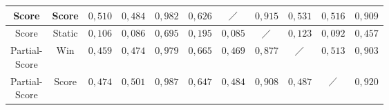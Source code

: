\begin{table}[H]
{\begin{tabular}{|c|c|c|c|c|c|c|c|c|c|c|}
            Score                             & Score         & \cellcolor[HTML]{fceb84}$0{,}510$ & \cellcolor[HTML]{fee683}$0{,}484$ & \cellcolor[HTML]{69c07c}$0{,}982$ & \cellcolor[HTML]{d8e082}$0{,}626$ & $\diagup$                         & \cellcolor[HTML]{7ec67d}$0{,}915$ & \cellcolor[HTML]{f6e984}$0{,}531$ & \cellcolor[HTML]{fbea84}$0{,}516$ & \cellcolor[HTML]{80c77d}$0{,}909$ \\ \hline
            Score                             & Static        & \cellcolor[HTML]{f98470}$0{,}106$ & \cellcolor[HTML]{f97f6f}$0{,}086$ & \cellcolor[HTML]{c3da81}$0{,}695$ & \cellcolor[HTML]{fa9b74}$0{,}195$ & \cellcolor[HTML]{f97f6f}$0{,}085$ & $\diagup$                         & \cellcolor[HTML]{f98871}$0{,}123$ & \cellcolor[HTML]{f9806f}$0{,}092$ & \cellcolor[HTML]{fedf81}$0{,}457$ \\ \hline
            \tiny \makecell{Partial-                                                                                                                                                                                                                                                                                                                                                              \\Score} &           Win & \cellcolor[HTML]{fee081}$0{,}459$ & \cellcolor[HTML]{fee482}$0{,}474$ & \cellcolor[HTML]{6ac07c}$0{,}979$ & \cellcolor[HTML]{ccdd82}$0{,}665$ & \cellcolor[HTML]{fee282}$0{,}469$ & \cellcolor[HTML]{8aca7e}$0{,}877$ & $\diagup$                         & \cellcolor[HTML]{fbea84}$0{,}513$ & \cellcolor[HTML]{82c77d}$0{,}903$ \\ \hline
            \tiny \makecell{Partial-                                                                                                                                                                                                                                                                                                                                                              \\Score} &         Score & \cellcolor[HTML]{fee482}$0{,}474$ & \cellcolor[HTML]{ffeb84}$0{,}501$ & \cellcolor[HTML]{68c07c}$0{,}987$ & \cellcolor[HTML]{d2de82}$0{,}647$ & \cellcolor[HTML]{fee683}$0{,}484$ & \cellcolor[HTML]{80c77d}$0{,}908$ & \cellcolor[HTML]{fee783}$0{,}487$ & $\diagup$                         & \cellcolor[HTML]{7cc67d}$0{,}920$ \\ \hline

\end{tabular}}
\end{table}
